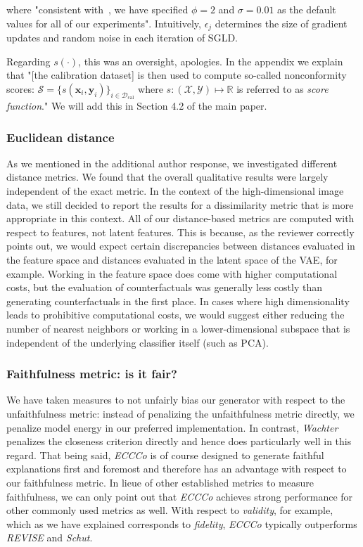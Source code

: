 \documentclass[letterpaper]{article} %
\begin{document}
where "consistent with~\citet{grathwohl2020your}, we have specified $\phi=2$ and $\sigma=0.01$ as the default values for all of our experiments". Intuitively, $\epsilon_j$ determines the size of gradient updates and random noise in each iteration of SGLD.

Regarding $s(\cdot)$, this was an oversight, apologies. In the appendix we explain that "[the calibration dataset] is then used to compute so-called nonconformity scores: $\mathcal{S}=\{s(\mathbf{x}_i,\mathbf{y}_i)\}_{i \in \mathcal{D}_{\text{cal}}}$ where $s: (\mathcal{X},\mathcal{Y}) \mapsto \mathbb{R}$ is referred to as \textit{score function}." We will add this in Section 4.2 of the main paper. 

\subsubsection{Euclidean distance}

As we mentioned in the additional author response, we investigated different distance metrics. We found that the overall qualitative results were largely independent of the exact metric. In the context of the high-dimensional image data, we still decided to report the results for a dissimilarity metric that is more appropriate in this context. All of our distance-based metrics are computed with respect to features, not latent features. This is because, as the reviewer correctly points out, we would expect certain discrepancies between distances evaluated in the feature space and distances evaluated in the latent space of the VAE, for example. Working in the feature space does come with higher computational costs, but the evaluation of counterfactuals was generally less costly than generating counterfactuals in the first place. In cases where high dimensionality leads to prohibitive computational costs, we would suggest either reducing the number of nearest neighbors or working in a lower-dimensional subspace that is independent of the underlying classifier itself (such as PCA).

\subsubsection{Faithfulness metric: is it fair?}

We have taken measures to not unfairly bias our generator with respect to the unfaithfulness metric: instead of penalizing the unfaithfulness metric directly, we penalize model energy in our preferred implementation. In contrast, \textit{Wachter} penalizes the closeness criterion directly and hence does particularly well in this regard. That being said, \textit{ECCCo} is of course designed to generate faithful explanations first and foremost and therefore has an advantage with respect to our faithfulness metric. In lieue of other established metrics to measure faithfulness, we can only point out that \textit{ECCCo} achieves strong performance for other commonly used metrics as well. With respect to \textit{validity}, for example, which as we have explained corresponds to \textit{fidelity}, \textit{ECCCo} typically outperforms \textit{REVISE} and \textit{Schut}.  
\end{document}
